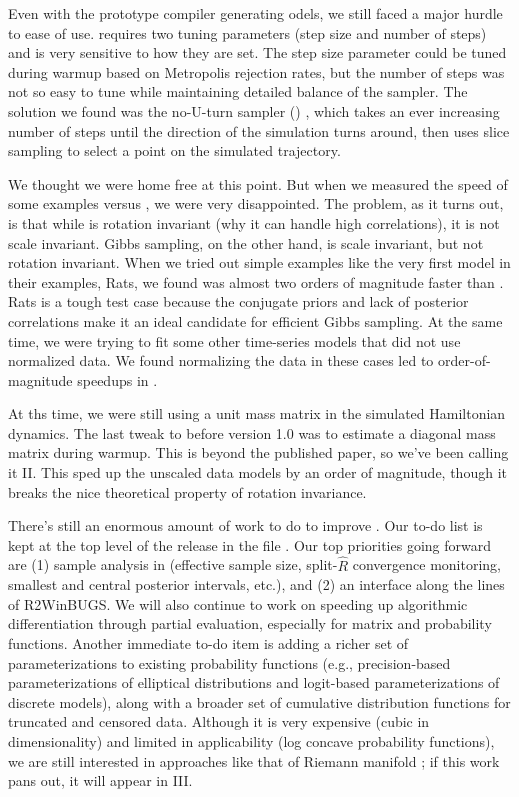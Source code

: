 Even with the prototype compiler generating odels, we still faced a
major hurdle to ease of use.  \HMC requires two tuning parameters
(step size and number of steps) and is very sensitive to how they are
set.  The step size parameter could be tuned during warmup based on
Metropolis rejection rates, but the number of steps was not so easy to
tune while maintaining detailed balance of the sampler.  The solution
we found was the no-U-turn sampler (\NUTS) \cite{Hoffman-Gelman:2012},
which takes an ever increasing number of steps until the direction of
the simulation turns around, then uses slice sampling to select a
point on the simulated trajectory.  

We thought we were home free at this point.  But when we measured the
speed of some \BUGS examples versus \Stan, we were very disappointed.
The problem, as it turns out, is that while \HMC is rotation invariant
(why it can handle high correlations), it is not scale invariant.
Gibbs sampling, on the other hand, is scale invariant, but not
rotation invariant.  When we tried out simple \BUGS examples like the
very first model in their examples, Rats, we found \JAGS was almost
two orders of magnitude faster than \Stan.  Rats is a tough test case
because the conjugate priors and lack of posterior correlations make
it an ideal candidate for efficient Gibbs sampling.  At the same time,
we were trying to fit some other time-series models that did not use
normalized data.  We found normalizing the data in these cases led
to order-of-magnitude speedups in \Stan.   

At ths time, we were still using a unit mass matrix in the simulated
Hamiltonian dynamics.  The last tweak to \Stan before version 1.0 was
to estimate a diagonal mass matrix during warmup.  This is beyond the
published \NUTS paper, so we've been calling it \NUTS II.  This sped
up the unscaled data models by an order of magnitude, though it 
breaks the nice theoretical property of rotation invariance.

There's still an enormous amount of work to do to improve \Stan.  Our
to-do list is kept at the top level of the release in the file
.  Our top priorities going forward are (1) sample
analysis in \Cpp (effective sample size, split-$\hat{R}$ convergence
monitoring, smallest and central posterior intervals, etc.), and (2)
an \R interface along the lines of {\small R2WinBUGS}.  We will also
continue to work on speeding up algorithmic differentiation through
partial evaluation, especially for matrix and probability functions.
Another immediate to-do item is adding a richer set of
parameterizations to existing probability functions (e.g.,
precision-based parameterizations of elliptical distributions and
logit-based parameterizations of discrete models), along with a
broader set of cumulative distribution functions for truncated and
censored data.  Although it is very expensive (cubic in
dimensionality) and limited in applicability (log concave probability
functions), we are still interested in approaches like that of Riemann
manifold \HMC \cite{GirolamiCalderhead:2011}; if this work pans out,
it will appear in \NUTS III.

